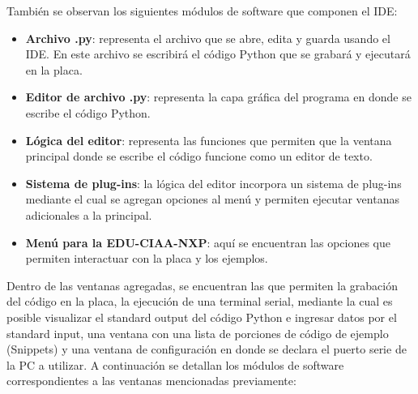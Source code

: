 También se observan los siguientes módulos de software que componen el IDE:

\begin{itemize}
	\item \textbf{Archivo .py}: representa el archivo que se abre, edita y guarda usando el IDE. En este archivo se escribirá el código Python que se grabará y ejecutará en la placa.
	\item \textbf{Editor de archivo .py}: representa la capa gráfica del programa en donde se escribe el código Python.
	\item \textbf{Lógica del editor}: representa las funciones que permiten que la ventana principal donde se escribe el código funcione como un editor de texto.
	\item \textbf{Sistema de plug-ins}: la lógica del editor incorpora un sistema de plug-ins mediante el cual se agregan opciones al menú y permiten ejecutar ventanas adicionales a la principal.
	\item \textbf{Menú para la EDU-CIAA-NXP}: aquí se encuentran las opciones que permiten interactuar con la placa y los ejemplos.
\end{itemize}

Dentro de las ventanas agregadas, se encuentran las que permiten la grabación del código en la placa, la ejecución de una terminal serial, mediante la cual es posible visualizar el standard output del código Python e ingresar datos por el standard input, una ventana con una lista de porciones de código de ejemplo (Snippets) y una ventana de configuración en donde se declara el puerto serie de la PC a utilizar.
A continuación se detallan los módulos de software correspondientes a las ventanas mencionadas previamente:

